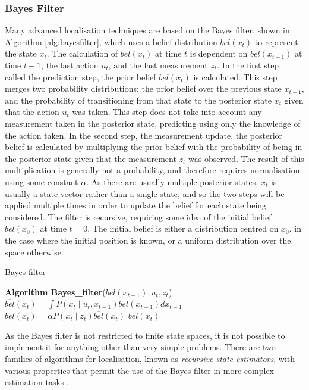 \documentclass[conference]{IEEEtran}
\begin{document}
\subsubsection{Bayes Filter}
Many advanced localisation techniques are based on the Bayes filter, shown in Algorithm \ref{alg:bayesfilter}, which uses a belief distribution $bel(x_t)$ to represent the state $x_t$. The calculation of $bel(x_t)$ at time $t$ is dependent on $bel(x_{t-1})$ at time $t-1$, the last action $u_t$, and the last measurement $z_t$. In the first step, called the prediction step, the prior belief $\overline{bel}(x_t)$ is calculated. This step merges two probability distributions; the prior belief over the previous state $x_{t-1}$, and the probability of transitioning from that state to the posterior state $x_t$ given that the action $u_t$ was taken. This step does not take into account any measurement taken in the posterior state, predicting using only
the knowledge of the action taken. In the second step, the measurement update, the posterior belief is calculated by multiplying the prior belief with the probability of being in the posterior state given that the measurement $z_t$ was observed. The result of this multiplication is generally not a probability, and therefore requires normalisation using some constant $\alpha$. As there are usually multiple posterior states, $x_t$ is usually a state vector rather than a single state, and so the two steps will be applied multiple times in order to update the belief for each state being considered. The filter is recursive, requiring some idea of the initial belief $bel(x_0)$ at time $t=0$. The initial belief is either a distribution centred on $x_0$, in the case where the initial position is known, or a uniform distribution over the space otherwise.
\begin{algorithm}
  \caption{Bayes filter \cite{thrun}}
  \label{alg:bayesfilter}
  \begin{algorithmic}[1]
        \State \textbf{Algorithm Bayes\_filter}\textnormal{($bel(x_{t-1}), u_t, z_t$)}
        \State $\overline{bel}(x_t)=\int P(x_t\mid u_t, x_{t-1})bel(x_{t-1})dx_{t-1}$
        \State $bel(x_t)=\alpha P(x_t \mid z_t)\overline{bel}(x_t)$
        \EndFor
        \State \Return $bel(x_t)$
  \end{algorithmic}
\end{algorithm}
As the Bayes filter is not restricted to finite state spaces, it is not possible to implement it for anything other than very simple problems. There are two families of algorithms for localisation, known as \emph{recursive state estimators}, with various properties that permit the use of the Bayes filter in more complex estimation tasks \cite{thrun}.
\end{document}
